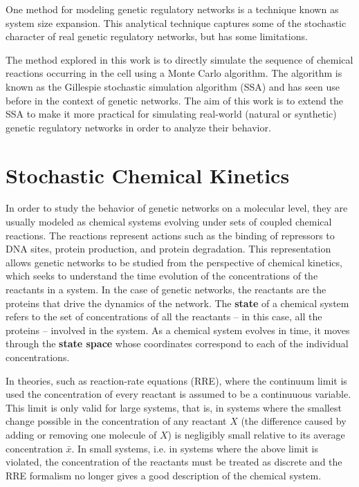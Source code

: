 \documentclass[english,letterpaper,12pt]{article}
\newcommand{\defkeywd}[1]{\textbf{#1}}
\begin{document}
\begin{doublespacing}
One method for modeling genetic regulatory networks is a technique known as system size expansion. This analytical technique captures some of the stochastic character of real genetic regulatory networks, but has some limitations. 

The method explored in this work is to directly simulate the sequence of chemical reactions occurring in the cell using a Monte Carlo algorithm. The algorithm is known as the Gillespie stochastic simulation algorithm (SSA) and has seen use before in the context of genetic networks.  The aim of this work is to extend the SSA to make it more practical for simulating real-world (natural or synthetic) genetic regulatory networks in order to analyze their behavior.


\section{Stochastic Chemical Kinetics} %
\label{sec:chemkin}

In order to study the behavior of genetic networks on a molecular level,  they are usually modeled as chemical systems evolving under sets of coupled chemical reactions. The reactions represent actions such as the binding of repressors to DNA sites, protein production, and protein degradation. This representation allows genetic networks to be studied from the perspective of chemical kinetics, which seeks to understand the time evolution of the concentrations of the reactants in a system. In the case of genetic networks, the reactants are the proteins that drive the dynamics of the network.  The \defkeywd{state} of a chemical system refers to the set of concentrations of all the reactants -- in this case, all the proteins  -- involved in the system. As a chemical system evolves in time, it moves through the \defkeywd{state space} whose coordinates correspond to each of the individual concentrations.

In theories, such as reaction-rate equations (RRE), where the continuum limit is used the concentration of every reactant is assumed to be a continuuous variable. This limit is only valid for large systems, that is, in systems where the smallest change possible in the concentration of any reactant $X$ (the difference caused by adding or removing one molecule of $X$) is negligibly small relative to its average concentration $\bar{x}$. In small systems, i.e. in systems where the above limit is violated, the concentration of the reactants must be treated as discrete and the RRE formalism no longer gives a good description of the chemical system.


\end{doublespacing}
\end{document}
